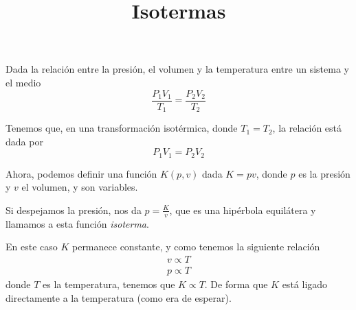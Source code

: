 \documentclass{article}
\title{Isotermas}
\begin{document}
\maketitle

Dada la relación entre la presión, el volumen y la temperatura entre un sistema y el medio
\begin{equation}
    \frac{P_1 V_1}{T_1} = \frac{P_2 V_2}{T_2}
\end{equation}

Tenemos que, en una transformación isotérmica, donde $T_1 = T_2$, la relación
está dada por
\begin{equation}
    P_1 V_1 = P_2 V_2
\end{equation}

Ahora, podemos definir una función $K(p, v)$ dada  $K = p v$, donde $p$ es la presión y $v$ el volumen, y son variables. 

Si despejamos la presión, nos da $p=\frac{K}{v}$, que es una hipérbola equilátera y llamamos a esta función \textit{isoterma}.

En este caso $K$ permanece constante, y como tenemos la siguiente relación
\begin{equation}
    \begin{split}
        v \propto T \\ 
        p \propto T
    \end{split}
\end{equation}
donde $T$ es la temperatura, tenemos que $K \propto T$. De forma que $K$ está ligado directamente a la temperatura (como era de esperar).

\begin{center}
\end{center}
\end{document}
